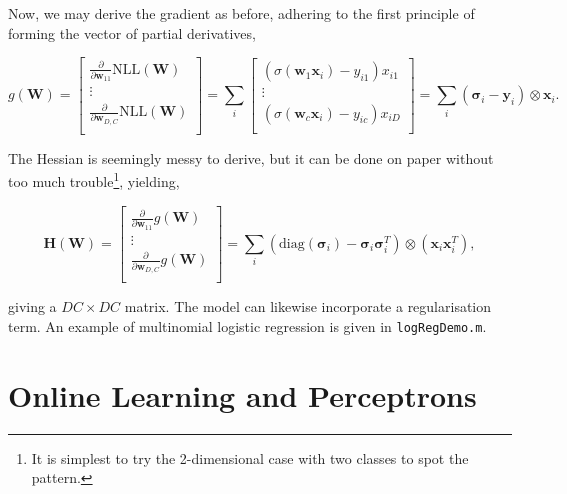 \documentclass[11pt]{amsart}
\begin{document}
Now, we may derive the gradient as before, adhering to the first principle of forming the vector of partial derivatives,

$$g(\mathbf{W}) = \begin{bmatrix}
\frac{\partial}{\partial \mathbf{w}_{11}} \text{NLL}(\mathbf{W}) \\
\vdots \\
\frac{\partial}{\partial \mathbf{w}_{D, C}} \text{NLL}(\mathbf{W}) \\
\end{bmatrix} =
\sum_i \begin{bmatrix}
(\sigma(\mathbf{w}_1\mathbf{x}_i) - y_{i1})x_{i1} \\
\vdots \\
(\sigma(\mathbf{w}_c\mathbf{x}_i) - y_{ic})x_{iD} \\
\end{bmatrix}
= \sum_i (\boldsymbol\sigma_i - \mathbf{y}_i)\otimes\mathbf{x}_i.
$$

The Hessian is seemingly messy to derive, but it can be done on paper without too much trouble\footnote{It is simplest to try the 2-dimensional case with two classes to spot the pattern.}, yielding,

$$\mathbf{H}(\mathbf{W}) =  \begin{bmatrix}
\frac{\partial}{\partial \mathbf{w}_{11}} g(\mathbf{W}) \\
\vdots \\
\frac{\partial}{\partial \mathbf{w}_{D, C}} g(\mathbf{W}) \\
\end{bmatrix} = \sum_i (\text{diag}(\boldsymbol\sigma_i) - \boldsymbol\sigma_i\boldsymbol\sigma_i^T)\otimes(\mathbf{x}_i\mathbf{x}_i^T),$$

giving a $DC \times DC$ matrix. The model can likewise incorporate a regularisation term. An example of multinomial logistic regression is given in \texttt{logRegDemo.m}.

\section{Online Learning and Perceptrons}
\end{document}
